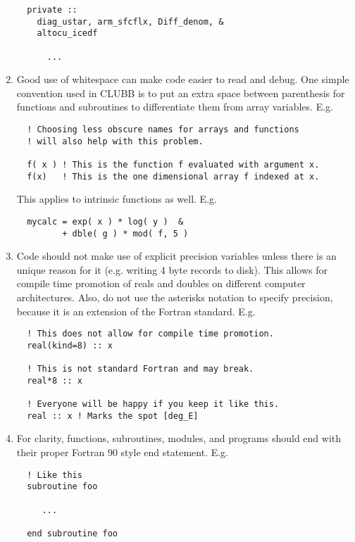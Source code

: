 \documentclass[letterpaper,12pt]{article}
\begin{document}
\begin{enumerate}
\begin{verbatim}
  private ::
    diag_ustar, arm_sfcflx, Diff_denom, &
    altocu_icedf

      ...

\end{verbatim}

\item Good use of whitespace can make code easier to read and debug.  
One simple convention used in CLUBB is to put an extra space between 
parenthesis for functions and subroutines to differentiate them from 
array variables. \newline
E.g.
\begin{verbatim}
  ! Choosing less obscure names for arrays and functions 
  ! will also help with this problem.

  f( x ) ! This is the function f evaluated with argument x.
  f(x)   ! This is the one dimensional array f indexed at x.
\end{verbatim}

This applies to intrinsic functions as well. \newline
E.g.
\begin{verbatim}
  mycalc = exp( x ) * log( y )  &
         + dble( g ) * mod( f, 5 )
\end{verbatim}

\item Code should not make use of explicit precision variables unless there is 
an unique reason for it (e.g. writing 4 byte records to disk).  This allows for 
compile time promotion of reals and doubles on different computer architectures.
Also, do not use the asterisks notation to specify precision, because it
is an extension of the Fortran standard.  E.g.
\begin{verbatim}
  ! This does not allow for compile time promotion.
  real(kind=8) :: x  

  ! This is not standard Fortran and may break.
  real*8 :: x

  ! Everyone will be happy if you keep it like this.
  real :: x ! Marks the spot [deg_E]
\end{verbatim}

\item For clarity, functions, subroutines, modules, and programs should end 
with their proper Fortran 90 style end statement. \newline
E.g.
\begin{verbatim}
  ! Like this
  subroutine foo

     ...

  end subroutine foo


\end{verbatim}
\end{enumerate}
\end{document}
